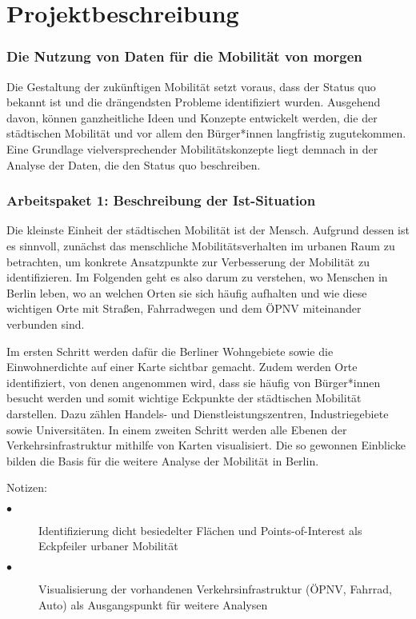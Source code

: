 \newpage
\section{Projektbeschreibung} \label{projektbeschreibung}

\subsubsection{Die Nutzung von Daten für die Mobilität von morgen}

Die Gestaltung der zukünftigen Mobilität setzt voraus, dass der Status quo bekannt ist und die drängendsten Probleme identifiziert wurden. Ausgehend davon, können ganzheitliche Ideen und Konzepte entwickelt werden, die der städtischen Mobilität und vor allem den Bürger*innen langfristig zugutekommen. Eine Grundlage vielversprechender Mobilitätskonzepte liegt demnach in der Analyse der Daten, die den Status quo beschreiben.


\subsubsection{Arbeitspaket 1: Beschreibung der Ist-Situation}

Die kleinste Einheit der städtischen Mobilität ist der Mensch. Aufgrund dessen ist es sinnvoll, zunächst das menschliche Mobilitätsverhalten im urbanen Raum zu betrachten, um konkrete Ansatzpunkte zur Verbesserung der Mobilität zu identifizieren. Im Folgenden geht es also darum zu verstehen, wo Menschen in Berlin leben, wo an welchen Orten sie sich häufig aufhalten und wie diese wichtigen Orte mit Straßen, Fahrradwegen und dem ÖPNV miteinander verbunden sind.

Im ersten Schritt werden dafür die Berliner Wohngebiete sowie die Einwohnerdichte auf einer Karte sichtbar gemacht. Zudem werden Orte identifiziert, von denen angenommen wird, dass sie häufig von Bürger*innen besucht werden und somit wichtige Eckpunkte der städtischen Mobilität darstellen. Dazu zählen Handels- und Dienstleistungszentren, Industriegebiete sowie Universitäten. In einem zweiten Schritt werden alle Ebenen der Verkehrsinfrastruktur mithilfe von Karten visualisiert. Die so gewonnen Einblicke bilden die Basis für die weitere Analyse der Mobilität in Berlin.

Notizen:
\begin{description}
    \item[$\bullet$] Identifizierung dicht besiedelter Flächen und Points-of-Interest als Eckpfeiler urbaner Mobilität
    \item[$\bullet$] Visualisierung der vorhandenen Verkehrsinfrastruktur (ÖPNV, Fahrrad, Auto) als Ausgangspunkt für weitere Analysen
  \end{description}

